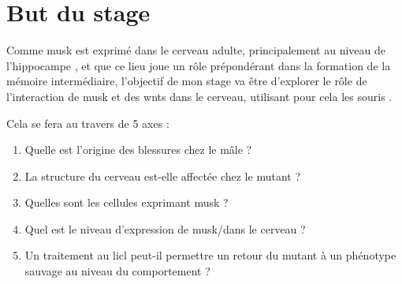 \section{But du stage}
\label{sec:IntroBut}

Comme \gls{musk} est exprimé dans le cerveau adulte, principalement au niveau de l'hippocampe \cite{Garcia-Osta2006}, et que ce lieu joue un rôle prépondérant dans la formation de la mémoire intermédiaire, l'objectif de mon stage va être d'explorer le rôle de l'interaction de \gls{musk} et des \Glspl{wnt} dans le cerveau, utilisant pour cela les souris \mcrd.

Cela se fera au travers de 5 axes : 
\begin{enumerate}
	\item Quelle est l'origine des blessures chez le mâle ?
	\item La structure du cerveau est-elle affectée chez le mutant ?
	\item Quelles sont les cellules exprimant \gls{musk} ?
	\item Quel est le niveau d'expression de \gls{musk}/\mcrd dans le cerveau ?
	\item Un traitement au \gls{licl} peut-il permettre un retour du mutant à un phénotype sauvage au niveau du comportement ?
\end{enumerate}